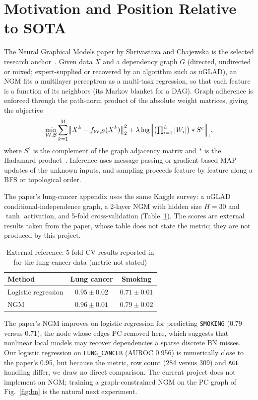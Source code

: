 \documentclass[10pt,twocolumn,letterpaper]{article}
\newcommand{\vn}[1]{{\small\texttt{#1}}}
\begin{document}
	\section{Motivation and Position Relative to SOTA}
	The Neural Graphical Models paper by Shrivastava and Chajewska is the selected research anchor~\cite{b1}. Given data \(X\) and a dependency graph \(G\) (directed, undirected or mixed; expert-supplied or recovered by an algorithm such as uGLAD), an NGM fits a multilayer perceptron as a multi-task regression, so that each feature is a function of its neighbors (its Markov blanket for a DAG). Graph adherence is enforced through the path-norm product of the absolute weight matrices, giving the objective
	\begin{equation}
		\min_{\mathcal{W},\mathcal{B}}\sum_{k=1}^{M}\bigl\|X^{k}-f_{\mathcal{W},\mathcal{B}}(X^{k})\bigr\|_2^2+\lambda\log\Bigl\|\bigl(\textstyle\prod_{i=1}^{L}|W_i|\bigr)\ast S^{c}\Bigr\|_1,
	\end{equation}
	where \(S^{c}\) is the complement of the graph adjacency matrix and \(\ast\) is the Hadamard product~\cite{b1}. Inference uses message passing or gradient-based MAP updates of the unknown inputs, and sampling proceeds feature by feature along a BFS or topological order.

	The paper's lung-cancer appendix uses the same Kaggle survey: a uGLAD conditional-independence graph, a 2-layer NGM with hidden size \(H = 30\) and \(\tanh\) activation, and 5-fold cross-validation (Table~\ref{tab:ext}). The scores are external results taken from the paper, whose table does not state the metric; they are not produced by this project.

	\begin{table}[h]\centering
		\caption{External reference: 5-fold CV results reported in \cite{b1} for the lung-cancer data (metric not stated)}\footnotesize
		\begin{tabular}{@{}lcc@{}}
			\toprule
			Method & Lung cancer & Smoking\\
			\midrule
			Logistic regression & \(0.95 \pm 0.02\) & \(0.71 \pm 0.01\)\\
			NGM & \(0.96 \pm 0.01\) & \(0.79 \pm 0.02\)\\
			\bottomrule
		\end{tabular}
		\label{tab:ext}
	\end{table}

	The paper's NGM improves on logistic regression for predicting \vn{SMOKING} (0.79 versus 0.71), the node whose edges PC removed here, which suggests that nonlinear local models may recover dependencies a sparse discrete BN misses. Our logistic regression on \vn{LUNG\_CANCER} (AUROC 0.956) is numerically close to the paper's 0.95, but because the metric, row count (284 versus 309) and \vn{AGE} handling differ, we draw no direct comparison. The current project does not implement an NGM; training a graph-constrained NGM on the PC graph of Fig.~\ref{fig:bn} is the natural next experiment.
\end{document}
